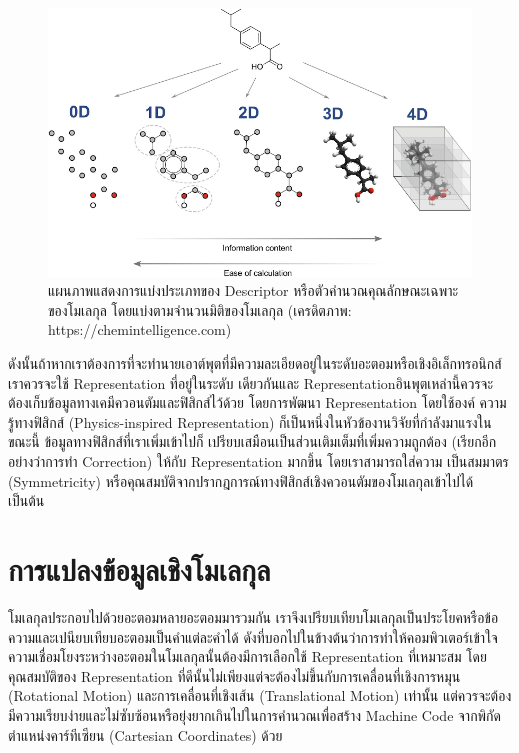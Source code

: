 \begin{figure}[htbp]
    \centering
    \includegraphics[width=\linewidth]{fig/descriptor_classes.png}
    \caption{แผนภาพแสดงการแบ่งประเภทของ Descriptor หรือตัวคำนวณคุณลักษณะเฉพาะของโมเลกุล โดยแบ่งตามจำนวนมิติของโมเลกุล 
    (เครดิตภาพ: https://chemintelligence.com)}
    \label{fig:descriptor_classes}
\end{figure}

ดังนั้นถ้าหากเราต้องการที่จะทำนายเอาต์พุตที่มีความละเอียดอยู่ในระดับอะตอมหรือเชิงอิเล็กทรอนิกส์ เราควรจะใช้ Representation ที่อยู่ในระดับ%
เดียวกันและ Representationอินพุตเหล่านี้ควรจะต้องเก็บข้อมูลทางเคมีควอนตัมและฟิสิกส์ไว้ด้วย โดยการพัฒนา Representation โดยใช้องค์%
ความรู้ทางฟิสิกส์ (Physics-inspired Representation) ก็เป็นหนึ่งในหัวข้องานวิจัยที่กำลังมาแรงในขณะนี้ ข้อมูลทางฟิสิกส์ที่เราเพิ่มเข้าไปก็%
เปรียบเสมือนเป็นส่วนเติมเต็มที่เพิ่มความถูกต้อง (เรียกอีกอย่างว่าการทำ Correction) ให้กับ Representation มากขึ้น โดยเราสามารถใส่ความ%
เป็นสมมาตร (Symmetricity) หรือคุณสมบัติจากปรากฎการณ์ทางฟิสิกส์เชิงควอนตัมของโมเลกุลเข้าไปได้ เป็นต้น 

\section{การแปลงข้อมูลเชิงโมเลกุล}
\label{sec:mol_transform}

โมเลกุลประกอบไปด้วยอะตอมหลายอะตอมมารวมกัน เราจึงเปรียบเทียบโมเลกุลเป็นประโยคหรือข้อความและเปนียบเทียบอะตอมเป็นคำแต่ละคำได้
ดังที่บอกไปในข้างต้นว่าการทำให้คอมพิวเตอร์เข้าใจความเชื่อมโยงระหว่างอะตอมในโมเลกุลนั้นต้องมีการเลือกใช้ Representation ที่เหมาะสม
โดยคุณสมบัติของ Representation ที่ดีนั้นไม่เพียงแต่จะต้องไม่ขึ้นกับการเคลื่อนที่เชิงการหมุน (Rotational Motion) และการเคลื่อนที่เชิงเส้น 
(Translational Motion) เท่านั้น แต่ควรจะต้องมีความเรียบง่ายและไม่ซับซ้อนหรือยุ่งยากเกินไปในการคำนวณเพื่อสร้าง Machine Code 
จากพิกัดตำแหน่งคาร์ทีเซียน (Cartesian Coordinates) ด้วย

